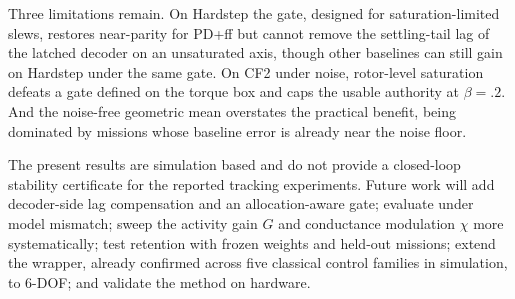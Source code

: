 \documentclass[letterpaper, 10 pt, conference]{ieeeconf}
\begin{document}
Three limitations remain. On Hardstep the gate, designed for saturation-limited slews, restores near-parity for PD+ff but cannot remove the settling-tail lag of the latched decoder on an unsaturated axis, though other baselines can still gain on Hardstep under the same gate. On CF2 under noise, rotor-level saturation defeats a gate defined on the torque box and caps the usable authority at $\beta=.2$. And the noise-free geometric mean overstates the practical benefit, being dominated by missions whose baseline error is already near the noise floor.

The present results are simulation based and do not provide a closed-loop stability certificate for the reported tracking experiments. Future work will add decoder-side lag compensation and an allocation-aware gate; evaluate under model mismatch; sweep the activity gain $G$ and conductance modulation $\chi$ more systematically; test retention with frozen weights and held-out missions; extend the wrapper, already confirmed across five classical control families in simulation, to 6-DOF; and validate the method on hardware.






\end{document}
